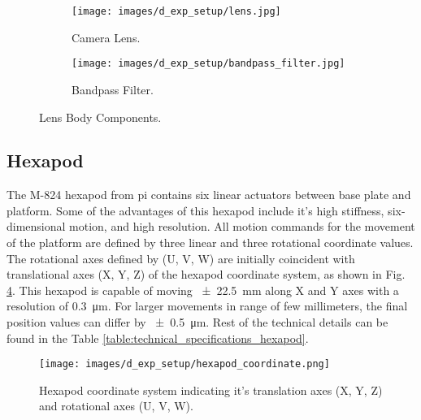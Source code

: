     \begin{figure}[h]
        \begin{subfigure}{0.5\textwidth}
            \centering
            \texttt{[image: images/d\_exp\_setup/lens.jpg]}
            \caption{Camera Lens. \cite{edmund_optics_lens}}
            \label{fig:lens.jpg}
        \end{subfigure}
        \begin{subfigure}{0.5\textwidth}
            \centering
            \texttt{[image: images/d\_exp\_setup/bandpass\_filter.jpg]}
            \caption{Bandpass Filter. \cite{thorlabs_bandpass_filter}}
            \label{fig:bandpass_filter.jpg}
        \end{subfigure}
        \caption{Lens Body Components.}
        \label{fig:lens_body.jpg}
    \end{figure}

\subsection{Hexapod}
The M-824 hexapod from \gls{pi} contains six linear actuators between base plate and platform. Some of the advantages of this hexapod include it's high stiffness, six-dimensional motion, and high resolution. All motion commands for the movement of the platform are defined by three linear and three rotational coordinate values. The rotational axes defined by (U, V, W) are initially coincident with translational axes (X, Y, Z) of the hexapod coordinate system, as shown in Fig. \ref{fig:hexapod_coordinate.png}. This hexapod is capable of moving \SI{\pm22.5}{\milli\meter} along X and Y axes with a resolution of \SI{0.3}{\micro\meter}. For larger movements in range of few millimeters, the final position values can differ by \SI{\pm0.5}{\micro\meter}. Rest of the technical details can be found in the Table \ref{table:technical_specifications_hexapod}.

\begin{figure}[h]
    \centering
    \texttt{[image: images/d\_exp\_setup/hexapod\_coordinate.png]}
    \caption{Hexapod coordinate system indicating it's translation axes (X, Y, Z) and rotational axes (U, V, W). \cite{hexapod_manual}}
    \label{fig:hexapod_coordinate.png}
\end{figure}

